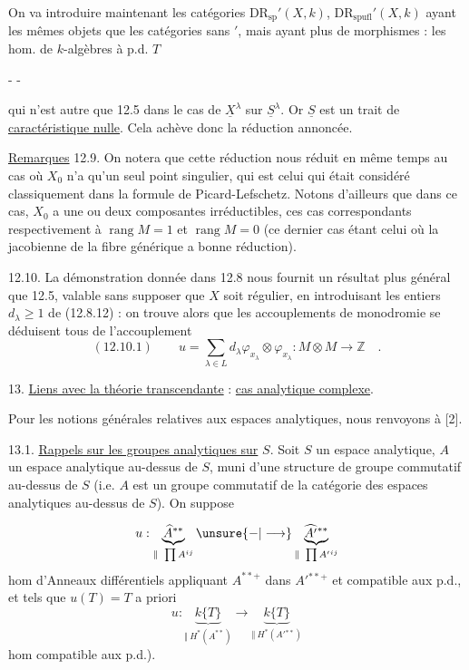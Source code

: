 On va introduire maintenant les catégories $\mathrm{DR}_{\mathrm{sp}}'(X,k)$, $\mathrm{DR}_{\mathrm{spufl}}'(X,k)$ ayant les mêmes objets que les catégories sans $'$, mais ayant plus de morphismes : les hom. de $k$-algèbres    à p.d.  $T$


\begin{center}-  -\end{center}
qui n'est autre que 12.5 dans le cas de $\underline X^\lambda$ sur $\underline S^\lambda$. Or $\underline S$ est un trait de \uline{caractéristique nulle}. Cela achève donc la réduction annoncée.

\uline{Remarques} 12.9. On notera que cette réduction nous réduit en même temps au cas où $X_0$ n'a qu'un seul point singulier, qui est celui qui était considéré classiquement dans la formule de Picard-Lefschetz. Notons d'ailleurs que dans ce cas, $X_0$ a une ou deux composantes irréductibles, ces cas correspondants respectivement à $\operatorname{rang}M=1$ et $\operatorname{rang}M=0$ (ce dernier cas étant celui où la jacobienne de la fibre générique a bonne réduction).

12.10. La démonstration donnée dans 12.8 nous fournit un résultat plus général que 12.5, valable sans supposer que $X$ soit régulier, en introduisant les entiers $d_\lambda\geq1$ de (12.8.12) : on trouve alors que les accouplements de monodromie se déduisent tous de l'accouplement
\[
(12.10.1)\qquad u=\sum_{\lambda\in L}d_\lambda\varphi_{x_\lambda}\otimes\varphi_{x_\lambda}:M\otimes M\longrightarrow\mathbb Z\quad.
\]

13. \uline{Liens avec la théorie transcendante} : \uline{cas analytique complexe}.

Pour les notions générales relatives aux espaces analytiques, nous renvoyons à [2].

13.1. \uline{Rappels sur les groupes analytiques sur} $S$. Soit $S$ un espace analytique, $A$ un espace analytique au-dessus de $S$, muni d'une structure de groupe commutatif au-dessus de $S$ (i.e. $A$ est un groupe commutatif de la catégorie des espaces analytiques au-dessus de $S$). On suppose


\[
u:\underbrace{\widehat A^{**}}_{\Vert\ \prod A^{ij}}\unsure{-|\longrightarrow}\underbrace{\widehat {A'}{}^{**}}_{\Vert\ \prod A'{}^{ij}}
\]
hom d'Anneaux différentiels appliquant $A^{**+}$ dans $A'{}^{**+}$ et compatible aux p.d., et tels que $u(T)=T$  a priori
\[
u:\underbrace{k\{T\}}_{\Vert\ H^*(A^{**})}\longrightarrow\underbrace{k\{T\}}_{\Vert\ H^*(A'{}^{**})}
\]
hom compatible aux p.d.). 

